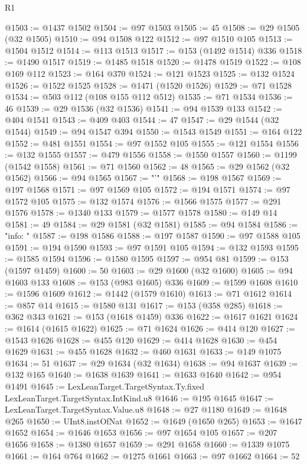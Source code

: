 \begin{lexlean}{R1}
\begin{coremodule}
{{{{{{{{{{{{{{{{{{{{{{{{{{{{{{{{{{{{{{{{{{{{{{{{{{{{{{{{{{{{{{{{{{{{{{{{{{{{{{{{{{{{{{{{{{{{{{{{{{{{{{{{{{{{{{{{{{{{{{{{{{{{{{{{{{{{{{{{{{{{{{{{{{{{{{{{{{{{{{{{{{{{{{{{{{{{{{{{{{{{{{{{{{@1503 := @1437 @1502
@1504 := @97 @1503
@1505 := 45
@1508 := @29 @1505 (@32 @1505)
@1510 := @94 @1508 @122
@1512 := @97 @1510 @105
@1513 := @1504 @1512
@1514 := @113 @1513
@1517 := @153 (@1492 @1514) @336
@1518 := @1490 @1517
@1519 := @1485 @1518
@1520 := @1478 @1519
@1522 := @108 @169 @112
@1523 := @164 @370
@1524 := @121 @1523
@1525 := @132 @1524
@1526 := @1522 @1525
@1528 := @1471 (@1520 @1526)
@1529 := @71 @1528
@1534 := @503 @112 (@108 @155 @112 @512)
@1535 := @71 @1534
@1536 := 46
@1539 := @29 @1536 (@32 @1536)
@1541 := @94 @1539 @133
@1542 := @404 @1541
@1543 := @409 @403
@1544 := 47
@1547 := @29 @1544 (@32 @1544)
@1549 := @94 @1547 @394
@1550 := @1543 @1549
@1551 := @164 @122
@1552 := @481 @1551
@1554 := @97 @1552 @105
@1555 := @121 @1554
@1556 := @132 @1555
@1557 := @479 @1556
@1558 := @1550 @1557
@1560 := @1199 (@1542 @1558)
@1561 := @71 @1560
@1562 := 48
@1565 := @29 @1562 (@32 @1562)
@1566 := @94 @1565
@1567 := "'"
@1568 := @198 @1567
@1569 := @197 @1568
@1571 := @97 @1569 @105
@1572 := @194 @1571
@1574 := @97 @1572 @105
@1575 := @132 @1574
@1576 := @1566 @1575
@1577 := @291 @1576
@1578 := @1340 @133
@1579 := @1577 @1578
@1580 := @149 @14
@1581 := 49
@1584 := @29 @1581 (@32 @1581)
@1585 := @94 @1584
@1586 := "info: "
@1587 := @198 @1586
@1588 := @197 @1587
@1590 := @97 @1588 @105
@1591 := @194 @1590
@1593 := @97 @1591 @105
@1594 := @132 @1593
@1595 := @1585 @1594
@1596 := @1580 @1595
@1597 := @954 @81
@1599 := @153 (@1597 @1459)
@1600 := 50
@1603 := @29 @1600 (@32 @1600)
@1605 := @94 @1603 @133
@1608 := @153 (@983 @1605) @336
@1609 := @1599 @1608
@1610 := @1596 @1609
@1612 := @1442 (@1579 @1610)
@1613 := @71 @1612
@1614 := @857 @14
@1615 := @1580 @131
@1617 := @153 (@358 @285)
@1618 := @362 @343
@1621 := @153 (@1618 @1459) @336
@1622 := @1617 @1621
@1624 := @1614 (@1615 @1622)
@1625 := @71 @1624
@1626 := @414 @120
@1627 := @1543 @1626
@1628 := @455 @120
@1629 := @414 @1628
@1630 := @454 @1629
@1631 := @455 @1628
@1632 := @460 @1631
@1633 := @149 @1075
@1634 := 51
@1637 := @29 @1634 (@32 @1634)
@1638 := @94 @1637
@1639 := @132 @165
@1640 := @1638 @1639
@1641 := @1633 @1640
@1642 := @954 @1491
@1645 := LexLeanTarget.TargetSyntax.Ty.fixed LexLeanTarget.TargetSyntax.IntKind.u8
@1646 := @195 @1645
@1647 := LexLeanTarget.TargetSyntax.Value.u8
@1648 := @27 @1180
@1649 := @1648 @265
@1650 := UInt8.instOfNat
@1652 := @1649 (@1650 @265)
@1653 := @1647 @1652
@1654 := @1646 @1653
@1656 := @97 @1654 @105
@1657 := @207 @1656
@1658 := @1380 @1657
@1659 := @291 @1658
@1660 := @1339 @1075
@1661 := @164 @764
@1662 := @1275 @1661
@1663 := @97 @1662
@1664 := 52
}}}}}}}}}}}}}}}}}}}}}}}}}}}}}}}}}}}}}}}}}}}}}}}}}}}}}}}}}}}}}}}}}}}}}}}}}}}}}}}}}}}}}}}}}}}}}}}}}}}}}}}}}}}}}}}}}}}}}}}}}}}}}}}}}}}}}}}}}}}}}}}}}}}}}}}}}}}}}}}}}}}}}}}}}}}}}}}}}}}}}}}}}}
\end{coremodule}
\end{lexlean}
